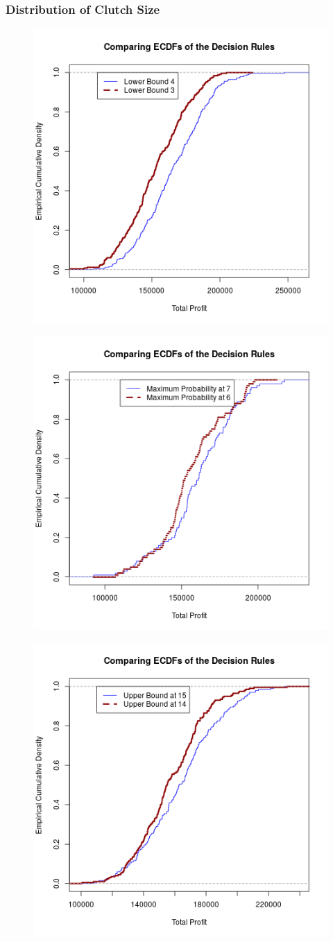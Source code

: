 \documentclass{article}
\begin{document}
		\subsubsection*{Distribution of Clutch Size}
		\begin{figure}[H]
		\centering
		\includegraphics[width=.5\textwidth]{lbECDF.png}
		\end{figure}
		\begin{figure}[H]
		\centering
		\includegraphics[width=.5\textwidth]{maxECDF.png}
		\end{figure}
		\begin{figure}[H]
		\centering
		\includegraphics[width=.5\textwidth]{ubECDF.png}
		\end{figure}
\end{document}
